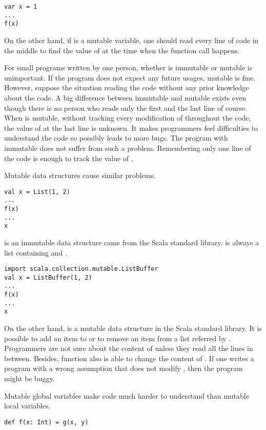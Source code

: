 \begin{verbatim}
var x = 1
...
f(x)
\end{verbatim}

On the other hand, if  is a mutable variable, one should read every line
of code in the middle to find the value of  at the time when the function
call happens.

For small programs written by one person, whether  is immutable or
mutable is unimportant. If the program does not expect any future usages, mutable
 is fine. However, suppose the situation reading the code without any
prior knowledge about the code. A big difference between immutable and mutable
 exists even though there is no person who reads only the first and the
last line of course. When  is mutable, without tracking every
modification of  throughout the code, the value of  at the last
line is unknown. It makes programmers feel difficulties to understand the code so
possibly leads to more bugs. The program with immutable  does not suffer
from such a problem. Remembering only one line of the code is enough to track the
value of .

Mutable data structures cause similar problems.

\begin{verbatim}
val x = List(1, 2)
...
f(x)
...
x
\end{verbatim}

 is an immutable data structure came from the Scala standard library.
 is always a list containing  and .

\begin{verbatim}
import scala.collection.mutable.ListBuffer
val x = ListBuffer(1, 2)
...
f(x)
...
x
\end{verbatim}

On the other hand,  is a mutable data structure in the Scala
standard library. It is possible to add an item to or to remove an item from a
list referred by . Programmers are not sure about the content of 
unless they read all the lines in between. Besides, function  also is
able to change the content of . If one writes a program with a wrong
assumption that  does not modify , then the program might be
buggy.

Mutable global variables make code much harder to understand than mutable local
variables.

\begin{verbatim}
def f(x: Int) = g(x, y)
\end{verbatim}

